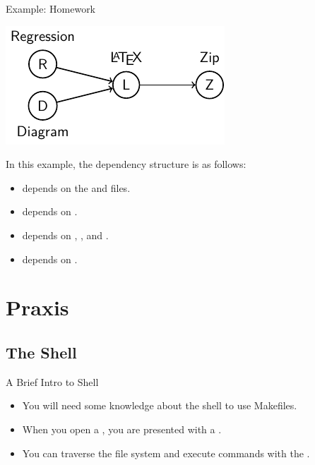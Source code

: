 \documentclass{beamer}
\begin{document}
\begin{frame}{Example: Homework}
	\begin{center}
		\includegraphics[scale=1]{figures/homework-workflow.pdf}
	\end{center}
	In this example, the dependency structure is as follows:
	\pause
	\begin{itemize}
		\item {} depends on the  and  files.
		\item {} depends on .
		\item {} depends on , , and .
		\item {} depends on .
	\end{itemize}
\end{frame}

\section{Praxis}

\subsection{The Shell}

\begin{frame}{A Brief Intro to Shell}
	\begin{itemize}
		\item
			You will need some knowledge about the shell to use Makefiles.
		\item
			When you open a ,
			you are presented with a .
		\item
			You can traverse the file system and execute commands with the .
	\end{itemize}
\end{frame}
\end{document}
